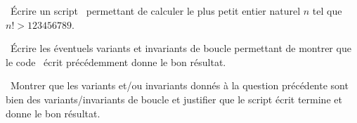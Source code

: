 \question\ Écrire un script \python\ permettant de calculer le plus petit entier naturel $n$ tel que $n!>123456789$.

\question\ Écrire les éventuels variants et invariants de boucle permettant de montrer que le code \python\ écrit précédemment donne le bon résultat.

\question\ Montrer que les variants et/ou invariants donnés à la question précédente sont bien des variants/invariants  
de boucle et justifier que le script écrit termine et donne le bon résultat. 
